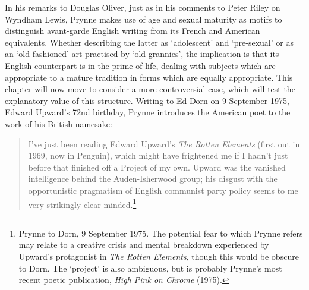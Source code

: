 \documentclass[]{article}
\begin{document}
In his remarks to Douglas Oliver, just as in his comments to Peter Riley
on Wyndham Lewis, Prynne makes use of age and sexual maturity as motifs
to distinguish avant-garde English writing from its French and American
equivalents. Whether describing the latter as `adolescent' and
`pre-sexual' or as an `old-fashioned' art practised by `old grannies',
the implication is that its English counterpart is in the prime of life,
dealing with subjects which are appropriate to a mature tradition in
forms which are equally appropriate. This chapter will now move to
consider a more controversial case, which will test the explanatory
value of this structure. Writing to Ed Dorn on 9 September 1975, Edward
Upward's 72nd birthday, Prynne introduces the American poet to the work
of his British namesake:

\begin{quote}
I've just been reading Edward Upward's \emph{The Rotten Elements} (first
out in 1969, now in Penguin), which might have frightened me if I hadn't
just before that finished off a Project of my own. Upward was the
vanished intelligence behind the Auden-Isherwood group; his disgust with
the opportunistic pragmatism of English communist party policy seems to
me very strikingly clear-minded.\footnote{Prynne to Dorn, 9 September
  1975. The potential fear to which Prynne refers may relate to a
  creative crisis and mental breakdown experienced by Upward's
  protagonist in \emph{The Rotten Elements}, though this would be
  obscure to Dorn. The `project' is also ambiguous, but is probably
  Prynne's most recent poetic publication, \emph{High Pink on Chrome}
  (1975).}
\end{quote}
\end{document}
